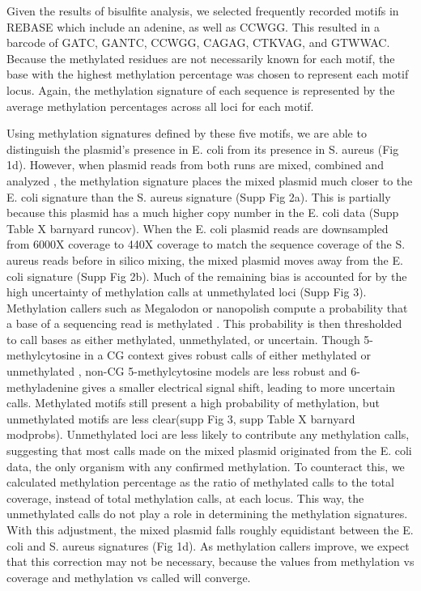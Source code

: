 Given the results of bisulfite analysis, we selected frequently recorded motifs in REBASE which include an adenine, as well as CCWGG. This resulted in a barcode of GATC, GANTC, CCWGG, CAGAG, CTKVAG, and GTWWAC. Because the methylated residues are not necessarily known for each motif, the base with the highest methylation percentage was chosen to represent each motif  locus. Again, the methylation signature of each sequence is represented by the average methylation percentages across all loci for each motif.

Using methylation signatures defined by these five motifs, we are able to distinguish the plasmid’s presence in E. coli from its presence in S. aureus (Fig 1d). However, when plasmid reads from both runs are mixed, combined and analyzed , the methylation signature places the mixed plasmid much closer to the E. coli signature than the S. aureus signature (Supp Fig 2a). This is partially because this plasmid has a much higher copy number in the E. coli data (Supp Table X barnyard runcov). When the E. coli plasmid reads are downsampled from 6000X coverage to 440X coverage to match the sequence coverage of the S. aureus reads before in silico mixing, the mixed plasmid moves away from the E. coli signature (Supp Fig 2b). Much of the remaining bias is accounted for by the high uncertainty of methylation calls at unmethylated loci (Supp Fig 3). Methylation callers such as Megalodon or nanopolish compute a probability that a base of a sequencing read is methylated \citep{Simpson2017-wb}. This probability is then thresholded to call bases as either methylated, unmethylated, or uncertain. Though 5-methylcytosine in a CG context gives robust calls of either methylated or unmethylated \citep{Simpson2017-wb}, non-CG 5-methylcytosine models are less robust and 6-methyladenine gives a smaller electrical signal shift, leading to more uncertain calls. Methylated motifs still present a high probability of methylation, but unmethylated motifs are less clear(supp Fig 3, supp Table X barnyard modprobs). Unmethylated loci are less likely to contribute any methylation calls, suggesting that most calls made on the mixed plasmid originated from the E. coli data, the only organism with any confirmed methylation. To counteract this, we calculated methylation percentage as the ratio of methylated calls to the total coverage, instead of total methylation calls, at each locus. This way, the unmethylated calls do not play a role in determining the methylation signatures. With this adjustment, the mixed plasmid falls roughly equidistant between the E. coli and S. aureus signatures (Fig 1d). As methylation callers improve, we expect that this correction may not be necessary, because the values from methylation vs coverage and methylation vs called will converge.

